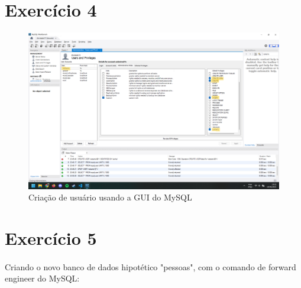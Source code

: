 \documentclass{article}
\begin{document}
\newpage

\section*{Exercício 4}

\begin{figure}[ht!]
    \centering
    \includegraphics[width=0.95\linewidth]{g.png}
    \caption{Criação de usuário usando a GUI do MySQL}
    \label{fig:cadastroGUI}
\end{figure}

\section*{Exercício 5}
\paragraph{} Criando o novo banco de dados hipotético "pessoas", com o comando de forward engineer do MySQL:
\end{document}
